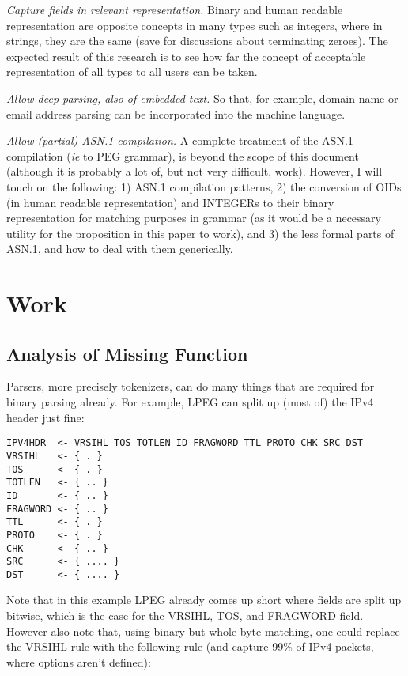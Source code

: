 \textit{Capture fields in relevant representation.} Binary and human 
readable representation are opposite concepts in many types such as 
integers, where in strings, they are the same (save for discussions about 
terminating zeroes). The expected result of this research is to see how 
far the concept of acceptable representation of all types to all users can 
be taken.

\textit{Allow deep parsing, also of embedded text.} So that, for example,
domain name or email address parsing can be incorporated into the machine 
language.

\textit{Allow (partial) ASN.1 compilation.} A complete treatment of the ASN.1 
compilation (\textit{ie} to PEG grammar), is beyond the scope of this document 
(although it is probably a lot of, but not very difficult, work). However, 
I will touch on the following: 1) ASN.1 compilation patterns, 2) the 
conversion of OIDs (in human readable representation) and INTEGERs to 
their binary representation for matching purposes in grammar (as it would 
be a necessary utility for the proposition in this paper to work), and 3) 
the less formal parts of ASN.1, and how to deal with them generically.

\newpage
\section{Work}

\subsection{Analysis of Missing Function}
Parsers, more precisely tokenizers, can do many things that are required 
for binary parsing already. For example, LPEG can split up (most of) the 
IPv4 header just fine:

\begin{changemargin}{-60mm}{0mm}
\begin{myquote}
\begin{verbatim}
IPV4HDR  <- VRSIHL TOS TOTLEN ID FRAGWORD TTL PROTO CHK SRC DST
VRSIHL   <- { . }
TOS      <- { . }
TOTLEN   <- { .. }
ID       <- { .. }
FRAGWORD <- { .. }
TTL      <- { . }
PROTO    <- { . }
CHK      <- { .. }
SRC      <- { .... }
DST      <- { .... }
\end{verbatim}
\end{myquote}
\end{changemargin}

Note that in this example LPEG already comes up short where fields are 
split up bitwise, which is the case for the VRSIHL, TOS, and FRAGWORD 
field. However also note that, using binary but whole-byte matching, one 
could replace the VRSIHL rule with the following rule (and capture 99\% of 
IPv4 packets, where options aren’t defined):

